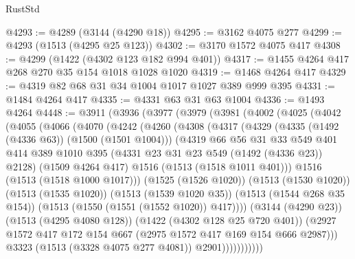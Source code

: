 \begin{lexlean}{RustStd}
\begin{coremodule}
@4293 := @4289 (@3144 (@4290 @18))
@4295 := @3162 @4075 @277
@4299 := @4293 (@1513 (@4295 @25 @123))
@4302 := @3170 @1572 @4075 @417
@4308 := @4299 (@1422 (@4302 @123 @182 @994 @401))
@4317 := @1455 @4264 @417 @268 @270 @35 @154 @1018 @1028 @1020
@4319 := @1468 @4264 @417
@4329 := @4319 @82 @68 @31 @34 @1004 @1017 @1027 @389 @999 @395
@4331 := @1484 @4264 @417
@4335 := @4331 @63 @31 @63 @1004
@4336 := @1493 @4264
@4448 := @3911
    (@3936
      (@3977
        (@3979
          (@3981
            (@4002
              (@4025
                (@4042
                  (@4055
                    (@4066
                      (@4070
                        (@4242
                          (@4260
                            (@4308
                              (@4317
                                (@4329
                                  (@4335 (@1492 (@4336 @63)) (@1500 (@1501 @1004)))
                                  (@4319
                                    @66
                                    @56
                                    @31
                                    @33
                                    @549
                                    @401
                                    @414
                                    @389
                                    @1010
                                    @395
                                    (@4331 @23 @31 @23 @549 (@1492 (@4336 @23)) @2128)
                                    (@1509 @4264 @417)
                                    @1516
                                    (@1513 (@1518 @1011 @401)))
                                  @1516
                                  (@1513 (@1518 @1000 @1017)))
                                (@1525 (@1526 @1020))
                                (@1513 (@1530 @1020))
                                (@1513 (@1535 @1020))
                                (@1513 (@1539 @1020 @35))
                                (@1513 (@1544 @268 @35 @154))
                                (@1513 (@1550 (@1551 (@1552 @1020)) @417))))
                            (@3144 (@4290 @23))
                            (@1513 (@4295 @4080 @128))
                            (@1422 (@4302 @128 @25 @720 @401))
                            (@2927
                              @1572
                              @417
                              @172
                              @154
                              @667
                              (@2975 @1572 @417 @169 @154 @666 @2987)))
                          @3323
                          (@1513 (@3328 @4075 @277 @4081))
                          @2901)))))))))))

\end{coremodule}
\end{lexlean}
